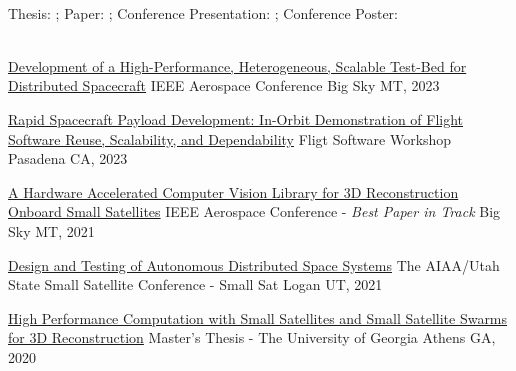 \documentclass[10pt,a4paper]{article}
\begin{document}
\spacedhrule{0.5em}{-0.4em}
\vspace{-0.2em}
~\\
\centerline{
Thesis: {\color{bluegreen} \faFileTextO} ; \hspace{2mm} Paper: {\color{bluegreen} \faStickyNoteO} ; \hspace{2mm}
Conference Presentation: {\color{bluegreen} \faTelevision} ; \hspace{2mm} Conference Poster: {\color{bluegreen} \faMapO}
}
\\

\headedsection
  {{\color{bluegreen} \faStickyNoteO} \href{\#}{Development of a High-Performance, Heterogeneous, Scalable Test-Bed for Distributed Spacecraft}}{%
  \headedsubsection
    {IEEE Aerospace Conference}
    {Big Sky MT, 2023}
    {}
}

\headedsection
  {{\color{bluegreen} \faTelevision} \href{\#}{Rapid Spacecraft Payload Development: In-Orbit Demonstration of Flight Software Reuse, Scalability, and Dependability}}{%
  \headedsubsection
    {Fligt Software Workshop}
    {Pasadena CA, 2023}
    {}
}

\headedsection
  {{\color{bluegreen} \faStickyNoteO} \href{https://ieeexplore.ieee.org/abstract/document/9438159}{A Hardware Accelerated Computer Vision Library for 3D Reconstruction Onboard Small Satellites}}{%
  \headedsubsection
    {IEEE Aerospace Conference - \textit{Best Paper in Track}}
    {Big Sky MT, 2021}
    {}
}

\headedsection
  {{\color{bluegreen} \faStickyNoteO} \href{https://digitalcommons.usu.edu/cgi/viewcontent.cgi?article=5003&context=smallsat}{Design and Testing of Autonomous Distributed Space Systems}}{%
  \headedsubsection
    {The AIAA/Utah State Small Satellite Conference - Small Sat}
    {Logan UT, 2021}
    {}
}

\headedsection
  {{\color{bluegreen} \faFileTextO} \href{http://piepieninja.github.io/research-papers/thesis-pre-release.pdf}{High Performance Computation with Small Satellites and Small Satellite Swarms for 3D Reconstruction}}{%
  \headedsubsection
    {Master's Thesis - The University of Georgia}
    {Athens GA, 2020}
    {}
}
\end{document}
